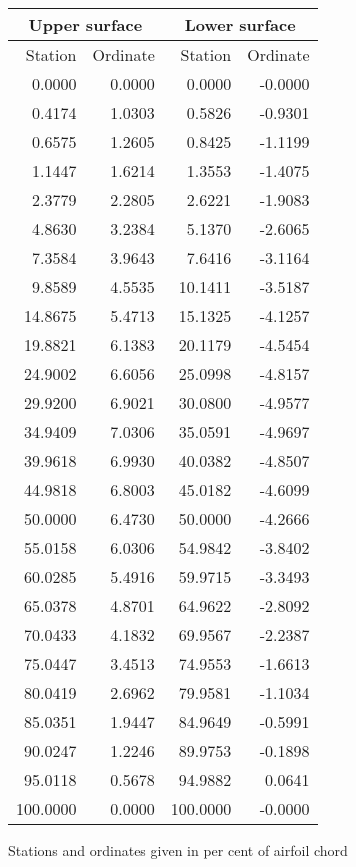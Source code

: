 \documentclass[11pt]{book}
\begin{document}
 \hspace{4mm}
 \begin{tabular}{|r|r|r|r|} \hline 
 \multicolumn{2}{|c|}{Upper surface} & \multicolumn{2}{|c|}{Lower surface} \\
 \hline
 Station & Ordinate & Station & Ordinate \\
 \hline
0.0000 & 0.0000 & 0.0000 & -0.0000 \\
0.4174 & 1.0303 & 0.5826 & -0.9301 \\
0.6575 & 1.2605 & 0.8425 & -1.1199 \\
1.1447 & 1.6214 & 1.3553 & -1.4075 \\
2.3779 & 2.2805 & 2.6221 & -1.9083 \\
4.8630 & 3.2384 & 5.1370 & -2.6065 \\
7.3584 & 3.9643 & 7.6416 & -3.1164 \\
9.8589 & 4.5535 & 10.1411 & -3.5187 \\
14.8675 & 5.4713 & 15.1325 & -4.1257 \\
19.8821 & 6.1383 & 20.1179 & -4.5454 \\
24.9002 & 6.6056 & 25.0998 & -4.8157 \\
29.9200 & 6.9021 & 30.0800 & -4.9577 \\
34.9409 & 7.0306 & 35.0591 & -4.9697 \\
39.9618 & 6.9930 & 40.0382 & -4.8507 \\
44.9818 & 6.8003 & 45.0182 & -4.6099 \\
50.0000 & 6.4730 & 50.0000 & -4.2666 \\
55.0158 & 6.0306 & 54.9842 & -3.8402 \\
60.0285 & 5.4916 & 59.9715 & -3.3493 \\
65.0378 & 4.8701 & 64.9622 & -2.8092 \\
70.0433 & 4.1832 & 69.9567 & -2.2387 \\
75.0447 & 3.4513 & 74.9553 & -1.6613 \\
80.0419 & 2.6962 & 79.9581 & -1.1034 \\
85.0351 & 1.9447 & 84.9649 & -0.5991 \\
90.0247 & 1.2246 & 89.9753 & -0.1898 \\
95.0118 & 0.5678 & 94.9882 & 0.0641 \\
100.0000 & 0.0000 & 100.0000 & -0.0000 \\
 \hline 
 \end{tabular}
 \vspace{8mm}

Stations and ordinates given in per cent of airfoil chord
\end{document}
